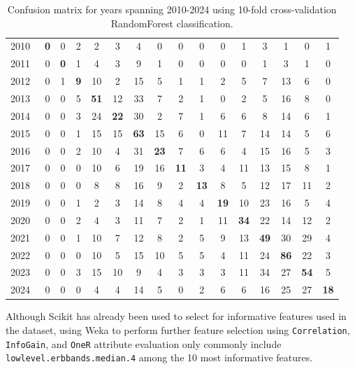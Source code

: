 \documentclass[article,pdftex,12pt,a4paper]{article}
\def\code#1{\texttt{#1}}
\begin{document}
\begin{table}[htp]
\centering
\setlength{\tabcolsep}{0.3em}
\begin{tabular}{|| c | c c c c c c c c c c c c c c c ||}
\hline
2010\  & \textbf{0} & 0 & 2 & 2 & 3 & 4 & 0 & 0 & 0 & 0 & 1 & 3 & 1 & 0 & 1 \\ 
2011\  & 0 & \textbf{0} & 1 & 4 & 3 & 9 & 1 & 0 & 0 & 0 & 0 & 1 & 3 & 1 & 0 \\ 
2012\  & 0 & 1 & \textbf{9} & 10 & 2 & 15 & 5 & 1 & 1 & 2 & 5 & 7 & 13 & 6 & 0 \\ 
2013\  & 0 & 0 & 5 & \textbf{51} & 12 & 33 & 7 & 2 & 1 & 0 & 2 & 5 & 16 & 8 & 0 \\ 
2014\  & 0 & 0 & 3 & 24 & \textbf{22} & 30 & 2 & 7 & 1 & 6 & 6 & 8 & 14 & 6 & 1 \\ 
2015\  & 0 & 0 & 1 & 15 & 15 & \textbf{63} & 15 & 6 & 0 & 11 & 7 & 14 & 14 & 5 & 6 \\ 
2016\  & 0 & 0 & 2 & 10 & 4 & 31 & \textbf{23} & 7 & 6 & 6 & 4 & 15 & 16 & 5 & 3 \\ 
2017\  & 0 & 0 & 0 & 10 & 6 & 19 & 16 & \textbf{11} & 3 & 4 & 11 & 13 & 15 & 8 & 1 \\ 
2018\  & 0 & 0 & 0 & 8 & 8 & 16 & 9 & 2 & \textbf{13} & 8 & 5 & 12 & 17 & 11 & 2 \\ 
2019\  & 0 & 0 & 1 & 2 & 3 & 14 & 8 & 4 & 4 & \textbf{19} & 10 & 23 & 16 & 5 & 4 \\ 
2020\  & 0 & 0 & 2 & 4 & 3 & 11 & 7 & 2 & 1 & 11 & \textbf{34} & 22 & 14 & 12 & 2 \\ 
2021\  & 0 & 0 & 1 & 10 & 7 & 12 & 8 & 2 & 5 & 9 & 13 & \textbf{49} & 30 & 29 & 4 \\ 
2022\  & 0 & 0 & 0 & 10 & 5 & 15 & 10 & 5 & 5 & 4 & 11 & 24 & \textbf{86} & 22 & 3 \\ 
2023\  & 0 & 0 & 3 & 15 & 10 & 9 & 4 & 3 & 3 & 3 & 11 & 34 & 27 & \textbf{54} & 5 \\ 
2024\  & 0 & 0 & 0 & 4 & 4 & 14 & 5 & 0 & 2 & 6 & 6 & 16 & 25 & 27 & \textbf{18} \\ [1ex]
\hline
\end{tabular}
\caption{Confusion matrix for years spanning 2010-2024 using 10-fold cross-validation RandomForest classification.}
\label{table_cm2}
\end{table}


Although Scikit has already been used to select for informative features used in the dataset, using Weka to perform further feature selection using \code{Correlation}, \code{InfoGain}, and \code{OneR} attribute evaluation only commonly include \code{lowlevel.erbbands.median.4} among the 10 most informative features.
\end{document}
